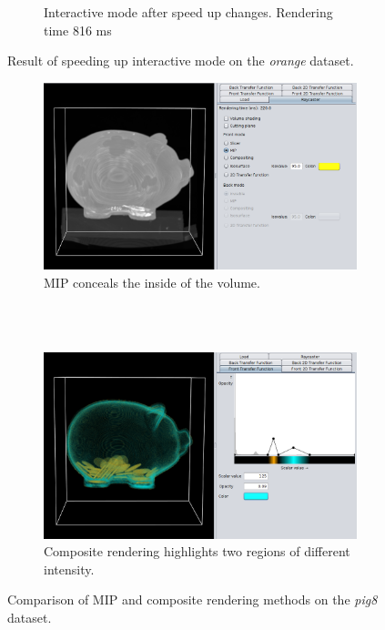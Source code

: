 \documentclass[a4paper]{article}
\begin{document}
\begin{figure}[h]
\begin{subfigure}[b]{0.45\textwidth}
    \caption{Interactive mode after speed up changes. Rendering time 816 ms}
  \end{subfigure}
  \caption{Result of speeding up interactive mode on the \textit{orange} dataset.}
  \label{fig:speedup}
\end{figure}

\begin{figure}[h]
  \centering
  \begin{subfigure}[b]{\textwidth}
    \includegraphics[width=\textwidth]{pig8-mip}
    \caption{MIP conceals the inside of the volume.}
  \end{subfigure}
  \\~\\
  \begin{subfigure}[b]{\textwidth}
    \includegraphics[width=\textwidth]{pig8-composite}
    \caption{Composite rendering highlights two regions of different intensity.}
  \end{subfigure}
  \caption{Comparison of MIP and composite rendering methods on the \textit{pig8} dataset.}
  \label{fig:mipscomp}
\end{figure}
\end{document}
